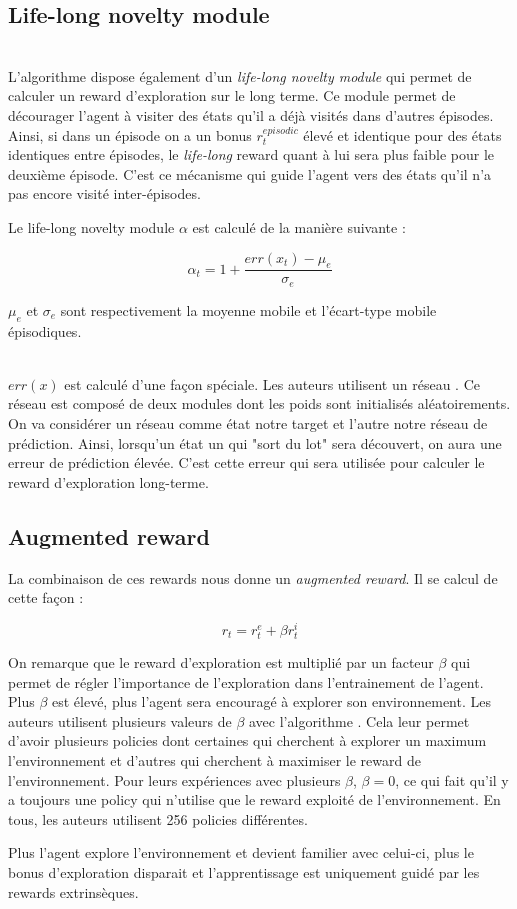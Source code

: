 \subsection{Life-long novelty module}


~\\
L'algorithme dispose également d'un \textit{life-long novelty module} qui permet de calculer un reward d'exploration sur le long terme. Ce module permet de décourager l'agent à visiter des états qu'il a déjà visités dans d'autres épisodes. Ainsi, si dans un épisode on a un bonus $r^{episodic}_t$ élevé et identique pour des états identiques entre épisodes, le \textit{life-long} reward quant à lui sera plus faible pour le deuxième épisode. C'est ce mécanisme qui guide l'agent vers des états qu'il n'a pas encore visité inter-épisodes.

Le life-long novelty module $\alpha$ est calculé de la manière suivante :

$$ \alpha_t = 1 + \frac{err(x_t)-\mu_e}{\sigma_e} $$

$\mu_e$ et $\sigma_e$ sont respectivement la moyenne mobile et l'écart-type mobile épisodiques.

~\\
$err(x)$ est calculé d'une façon spéciale. Les auteurs utilisent un réseau . Ce réseau est composé de deux modules dont les poids sont initialisés aléatoirements. On va considérer un réseau comme état notre target et l'autre notre réseau de prédiction. Ainsi, lorsqu'un état un qui "sort du lot" sera découvert, on aura une erreur de prédiction élevée. C'est cette erreur qui sera utilisée pour calculer le reward d'exploration long-terme.

\subsection{Augmented reward}

La combinaison de ces rewards nous donne un \textit{augmented reward}. Il se calcul de cette façon :

$$ r_t = r^e_t + \beta r^i_t $$

On remarque que le reward d'exploration est multiplié par un facteur $\beta$ qui permet de régler l'importance de l'exploration dans l'entrainement de l'agent. Plus $\beta$ est élevé, plus l'agent sera encouragé à explorer son environnement. Les auteurs utilisent plusieurs valeurs de $\beta$ avec l'algorithme . Cela leur permet d'avoir plusieurs policies dont certaines qui cherchent à explorer un maximum l'environnement et d'autres qui cherchent à maximiser le reward de l'environnement. Pour leurs expériences avec plusieurs $\beta$, $\beta = 0$, ce qui fait qu'il y a toujours une policy qui n'utilise que le reward exploité de l'environnement. En tous, les auteurs utilisent 256 policies différentes.

Plus l'agent explore l'environnement et devient familier avec celui-ci, plus le bonus d'exploration disparait et l'apprentissage est uniquement guidé par les rewards extrinsèques.